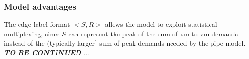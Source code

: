 \subsubsection{Model advantages}
The edge label format $<S, R>$ allows the model to exploit statistical multiplexing, since $S$ can represent the peak of the sum of \gls{vm}-to-\gls{vm} demands instead of the (typically larger) sum of peak demands needed by the pipe model.
\textbf{\textit{TO BE CONTINUED}} ...


